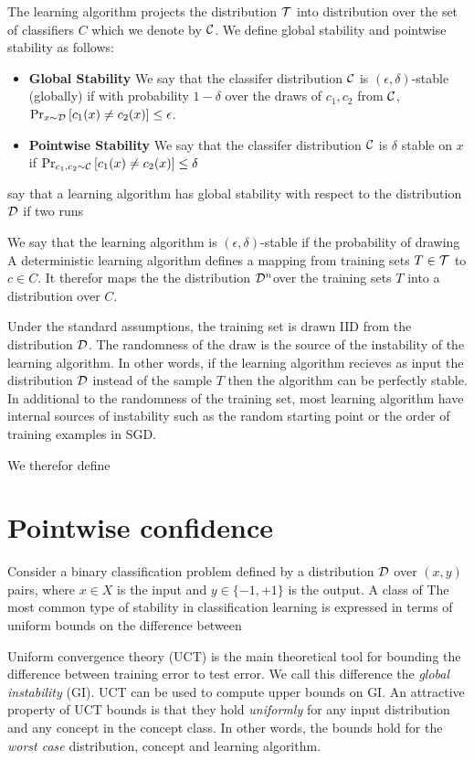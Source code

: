 \documentclass{article}
\begin{document}
The learning algorithm projects the distribution ${\cal T}$ into
distribution over the set of classifiers $C$ which we denote by
${\cal C}$.  We define global stability and pointwise stability as
follows:
\begin{itemize}
\item {\bf Global Stability} We say that
the classifer distribution ${\cal C}$ is $(\epsilon,\delta)$-stable (globally) if with
probability $1-\delta$ over the draws of $c_1,c_2$ from ${\cal C}$,  $\mbox{Pr}_{x \sim
  {\cal D}}\left[ c_1(x)\neq c_2(x) \right]\leq \epsilon$.
\item {\bf Pointwise Stability} We say that the classifer distribution
  ${\cal C}$ is $\delta$ stable on $x$ if $\mbox{Pr}_{c_1,c_2 \sim {\cal C}}\left[ c_1(x)
    \neq c_2(x) \right] \leq \delta$
\end{itemize}

say that a learning algorithm has global stability with respect to
the distribution ${\cal D}$ if two runs 

We say that the learning
algorithm is $(\epsilon,\delta)$-stable if the probability of drawing 
A deterministic learning algorithm defines a mapping from
training sets $T \in {\cal T}$ to $c\in C$. It therefor maps the the
distribution ${\cal D}^n$over the training sets $T$ into a distribution
over $C$.

Under the standard assumptions, the training set is drawn IID from the
distribution ${\cal D}$. The randomness of the draw is the source of the
instability of the learning algorithm. In other words, if the learning
algorithm recieves as input the distribution ${\cal D}$ instead of the
sample $T$ then the algorithm can be perfectly stable. In additional
to the randomness of the training set, most learning algorithm have
internal sources of instability such as the random starting point
or the order of training examples in SGD.

We therefor define 


\iffalse

\section{Pointwise confidence}

Consider a binary classification problem defined by a distribution
${\cal D}$ over $(x,y)$ pairs, where $x \in X$ is the input and $y \in
\{-1,+1\}$ is the output. A class of 
The most common type of stability in classification learning is
expressed in terms of uniform bounds on the difference between 


Uniform convergence theory (UCT) is the main theoretical tool for
bounding the difference between training error to test error. We call
this difference the {\em global instability} (GI).  UCT can be used to
compute upper bounds on GI.  An attractive property of UCT bounds is
that they hold {\em uniformly} for any input distribution and any
concept in the concept class. In other words, the bounds hold for the
{\em worst case} distribution, concept and learning algorithm.
\end{document}
